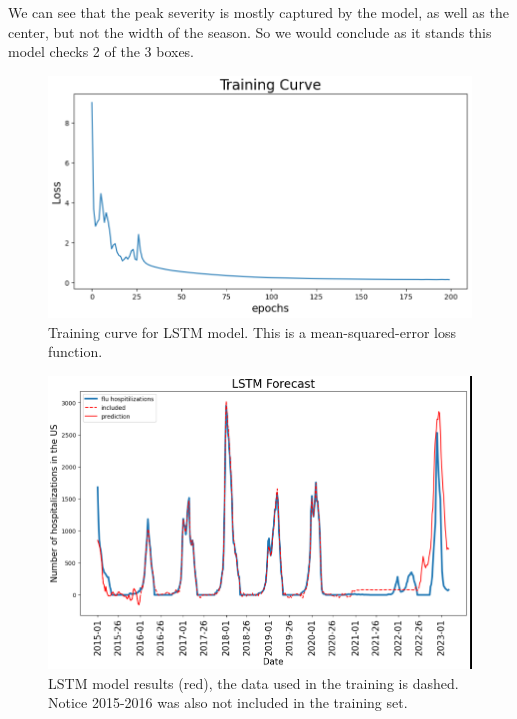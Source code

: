 \documentclass[12pt,a4paper,english]{article}
\begin{document}
We can see that the peak severity is mostly captured by the model, as well as the center, but not the width of the season. So we would conclude as it stands this model checks 2 of the 3 boxes. 




	\begin{figure}[h!]
		\begin{center}
		\includegraphics[scale=0.6]{Pictures/flu_train.png}
		\caption{Training curve for LSTM model. This is a mean-squared-error loss function.}
		\end{center}
		\label{fig:lstm_train}
	\end{figure}
\FloatBarrier


	\begin{figure}[h!]
		\begin{center}
		\includegraphics[scale=0.6]{Pictures/lstm_model.png}
		\caption{LSTM model results (red), the data used in the training is dashed. Notice 2015-2016 was also not included in the training set.}
		\end{center}
		\label{fig:lstm_model}
	\end{figure}
\FloatBarrier
\end{document}
